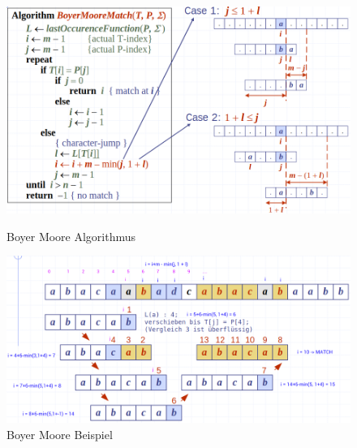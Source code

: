\begin{figure}[h!]
	\begin{minipage}[t]{1\textwidth}
		\centering
		\includegraphics[width=1\linewidth]{images/boyer_moore_alg}
		\caption{Boyer Moore Algorithmus}
		\label{fig:boyermoorealg}
	\end{minipage}
	\begin{minipage}[t]{1\textwidth}
		\centering
		\includegraphics[width=1\linewidth]{images/boyer_moore_beispiel}
		\caption{Boyer Moore Beispiel}
		\label{fig:boyermoorebeispiel}
	\end{minipage}
\end{figure}

\clearpage

